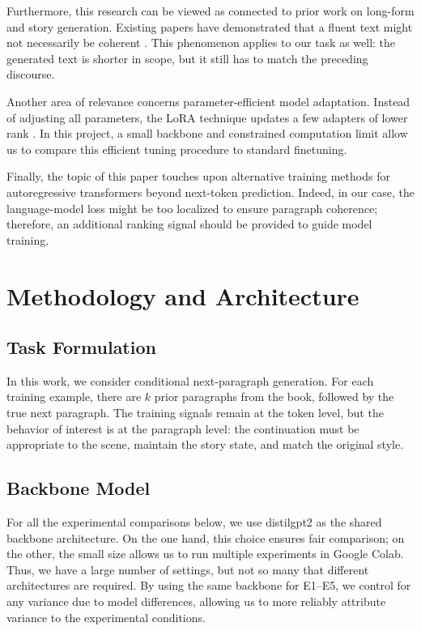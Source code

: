 \documentclass{article}
\newcommand{\model}{\mbox{\normalfont distilgpt2}}
\newcommand{\expid}[1]{\textsc{#1}}
\begin{document}
Furthermore, this research can be viewed as connected to prior work on long-form and story generation. Existing papers have demonstrated that a fluent text might not necessarily be coherent \citep{fan2018hierarchical,holtzman2020curious}. This phenomenon applies to our task as well: the generated text is shorter in scope, but it still has to match the preceding discourse.

Another area of relevance concerns parameter-efficient model adaptation. Instead of adjusting all parameters, the LoRA technique updates a few adapters of lower rank \citep{hu2022lora}. In this project, a small backbone and constrained computation limit allow us to compare this efficient tuning procedure to standard finetuning.

Finally, the topic of this paper touches upon alternative training methods for autoregressive transformers beyond next-token prediction. Indeed, in our case, the language-model loss might be too localized to ensure paragraph coherence; therefore, an additional ranking signal should be provided to guide model training.

\section{Methodology and Architecture}

\subsection{Task Formulation}

In this work, we consider conditional next-paragraph generation. For each training example, there are $k$ prior paragraphs from the book, followed by the true next paragraph. The training signals remain at the token level, but the behavior of interest is at the paragraph level: the continuation must be appropriate to the scene, maintain the story state, and match the original style.

\subsection{Backbone Model}

For all the experimental comparisons below, we use \model{} as the shared backbone architecture. On the one hand, this choice ensures fair comparison; on the other, the small size allows us to run multiple experiments in Google Colab. Thus, we have a large number of settings, but not so many that different architectures are required. By using the same backbone for \expid{E1}--\expid{E5}, we control for any variance due to model differences, allowing us to more reliably attribute variance to the experimental conditions.
\end{document}
